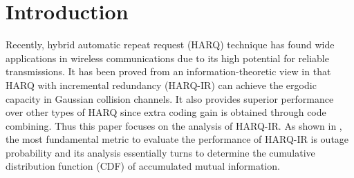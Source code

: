 \documentclass[12pt,onecolumn,draftcls]{IEEEtran}
\begin{document}
\section{Introduction}\label{sec:int}
Recently, hybrid automatic repeat request (HARQ) technique has found wide applications in wireless communications due to its high potential for reliable transmissions. It has been proved from an information-theoretic view in \cite{caire2001throughput} that HARQ with incremental redundancy (HARQ-IR) can achieve the ergodic capacity in Gaussian collision channels. It also provides superior performance over other types of HARQ since extra coding gain is obtained through code combining. Thus this paper focuses on the analysis of HARQ-IR. As shown in \cite{makki2014performance}, the most fundamental metric to evaluate the performance of HARQ-IR is outage probability and its analysis essentially turns to determine the cumulative distribution function (CDF) of accumulated mutual information.
\end{document}
